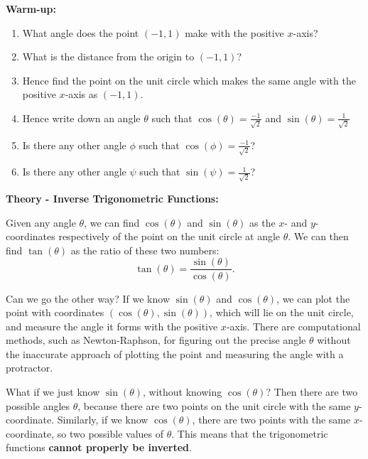 \documentclass{article}
\begin{document}
\clearpage

{\bf Warm-up:}

\vspace{5mm}

\begin{enumerate}
\item What angle does the point $(-1,1)$ make with the positive $x$-axis?
\item What is the distance from the origin to $(-1,1)$?
\item Hence find the point on the unit circle which makes the same angle with the positive $x$-axis as $(-1,1)$.
\item Hence write down an angle $\theta$ such that $\cos(\theta)=\frac{-1}{\sqrt{2}}$ and $\sin(\theta)=\frac{1}{\sqrt{2}}$
\item Is there any other angle $\phi$ such that $\cos(\phi)=\frac{-1}{\sqrt{2}}$?
\item Is there any other angle $\psi$ such that $\sin(\psi)=\frac{1}{\sqrt{2}}$?
\end{enumerate}

\clearpage





{\bf Theory - Inverse Trigonometric Functions:}

\vspace{5mm}

Given any angle $\theta$, we can find $\cos(\theta)$ and $\sin(\theta)$ as the $x$- and $y$-coordinates respectively of the point on the unit circle at angle $\theta$. We can then find $\tan(\theta)$ as the ratio of these two numbers:
\[\tan(\theta)=\frac{\sin(\theta)}{\cos(\theta)}.\]

Can we go the other way? If we know $\sin(\theta)$ and $\cos(\theta)$, we can plot the point with coordinates $(\cos(\theta),\sin(\theta))$, which will lie on the unit circle, and measure the angle it forms with the positive $x$-axis. There are computational methods, such as Newton-Raphson, for figuring out the precise angle $\theta$ without the inaccurate approach of plotting the point and measuring the angle with a protractor.

What if we just know $\sin(\theta)$, without knowing $\cos(\theta)$? Then there are two possible angles $\theta$, because there are two points on the unit circle with the same $y$-coordinate. Similarly, if we know $\cos(\theta)$, there are two points with the same $x$-coordinate, so two possible values of $\theta$. This means that the trigonometric functions \textbf{cannot properly be inverted}.
\end{document}
